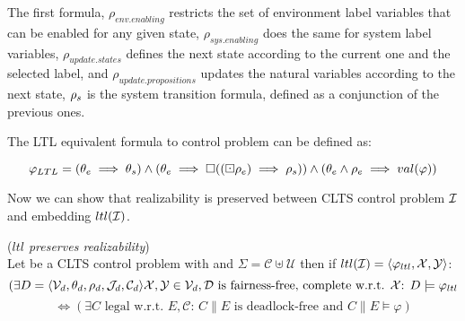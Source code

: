 The first formula, $\rho_{env.enabling}$ restricts the set of environment label variables that can be enabled for any given state, $\rho_{sys.enabling}$ does the same for system label variables, $\rho_{update.states}$ defines the next state according to the current one and the selected label, and $\rho_{update.propositions}$ updates the natural variables according to the next state, ${\rho_s}$ is the system transition formula, defined as a conjunction of the previous ones.
%
%


The LTL equivalent formula to control problem \controlProblemDef can be defined as:

\[ \varphi_{LTL} = (\theta_e \implies \theta_s) \wedge (\theta_e \implies \square((\boxdot \rho_e) \implies \rho_s)) \wedge (\theta_e \wedge \rho_e \implies val(\varphi)) \]

Now we can show that realizability is preserved between CLTS control problem ${\mathcal{I}}$ and embedding $ltl({\mathcal{I}})$.

\begin{theorem}(\emph{$ltl$ preserves realizability})\label{theorem:gs_preserves_realizability}\\
	Let \controlProblemDef be a CLTS control problem with  and $\Sigma = \mathcal{C}\uplus \mathcal{U}$ then if $ltl({\mathcal{I}}) = \langle \varphi_{ltl}, {\mathcal{X}}, {\mathcal{Y}}\rangle$:
	\small
	\[(\exists D= \langle \mathcal{V}_d, \theta_d, \rho_d, \mathcal{J}_d, \mathcal{C}_d\rangle    {\mathcal{X}}, {\mathcal{Y}} \in \mathcal{V}_d, \mathcal{D} \text{ is fairness-free, complete w.r.t. } {\mathcal{X}} \text{: } D \models \varphi_{ltl}\]
	 \[ \iff (\exists C \text{ legal w.r.t. } E,\mathcal{C} \text{: } C \parallel E \text{ is deadlock-free and } C \parallel E \models \varphi)  \]
	\normalsize
\end{theorem}

\newpage



